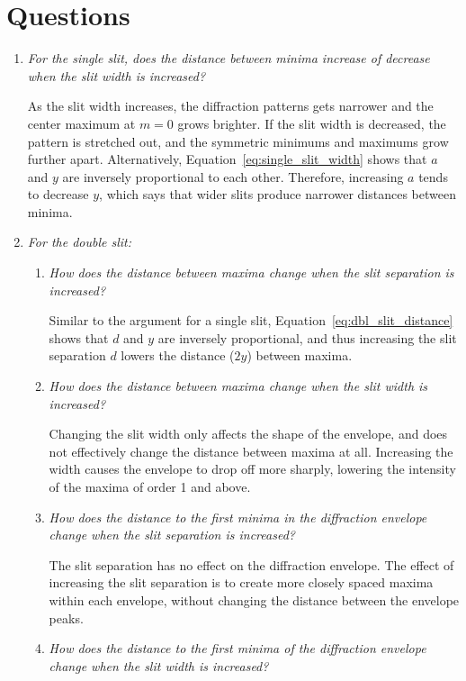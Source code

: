 \documentclass[twocolumn,english]{IEEEtran}
\theoremstyle{plain}
\theoremstyle{plain}
\begin{document}
\section{Questions}
\begin{enumerate}
	\item \textit{For the single slit, does the distance between minima increase of decrease when the slit width is increased?}

	As the slit width increases, the diffraction patterns gets narrower and the center maximum at $m=0$ grows brighter. If the slit width is decreased, the pattern is stretched out, and the symmetric minimums and maximums grow further apart. Alternatively, Equation~\ref{eq:single_slit_width} shows that $a$ and $y$ are inversely proportional to each other. Therefore, increasing $a$ tends to decrease $y$, which says that wider slits produce narrower distances between minima.

	\item \textit{For the double slit:}

	\begin{enumerate}
		\item \textit{How does the distance between maxima change when the slit separation is increased?}

		Similar to the argument for a single slit, Equation~\ref{eq:dbl_slit_distance} shows that $d$ and $y$ are inversely proportional, and thus increasing the slit separation $d$ lowers the distance ($2y$) between maxima.

		\item \textit{How does the distance between maxima change when the slit width is increased?}

		Changing the slit width only affects the shape of the envelope, and does not effectively change the distance between maxima at all. Increasing the width causes the envelope to drop off more sharply, lowering the intensity of the maxima of order 1 and above.

		\item \textit{How does the distance to the first minima in the diffraction envelope change when the slit separation is increased?}

		The slit separation has no effect on the diffraction envelope. The effect of increasing the slit separation is to create more closely spaced maxima within each envelope, without changing the distance between the envelope peaks.

		\item \textit{How does the distance to the first minima of the diffraction envelope change when the slit width is increased?}


\end{enumerate}
\end{enumerate}
\end{document}
